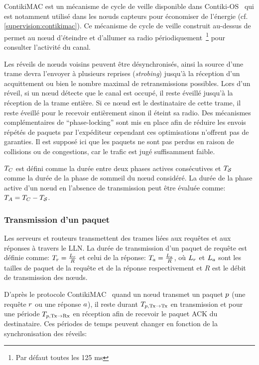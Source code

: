 ContikiMAC est un mécanisme de cycle de veille disponible dans Contiki-OS~\cite{dunkels11contikimac} qui est notamment utilisé dans les nœuds capteurs pour économiser de l'énergie (cf. \ref{supervision:contikimac}).
Ce mécanisme de cycle de veille construit au-dessus de \ieee{} permet au nœud d'éteindre et  d'allumer sa radio périodiquement~\footnote{Par défaut toutes les 125 ms} pour consulter l'activité du canal.

Les réveils de nœuds voisins peuvent être désynchronisés, ainsi la source d'une trame devra l'envoyer à plusieurs reprises ({\em strobing}) jusqu'à la réception d'un acquittement ou bien le nombre maximal de retransmissions possibles.
Lors d'un réveil, si un nœud détecte que le canal est occupé, il reste éveillé jusqu'à la réception de la trame entière.
Si ce nœud est le destinataire de cette trame, il reste éveillé pour le recevoir entièrement sinon il éteint sa radio.
Des mécanismes complémentaires de ``phase-locking'' sont mis en place afin de réduire les envois répétés de paquets par l'expéditeur cependant ces optimisations n'offrent pas de garanties.
Il est supposé ici que les paquets ne sont pas perdus en raison de collisions ou de congestions, car le trafic est jugé suffisamment faible.

$T_C$ est défini comme la durée entre deux phases actives consécutives et $T_{\mathcal{S}}$ comme la durée de la phase de sommeil du nœud considéré.
La durée de la phase active d'un nœud en l'absence de transmission peut être évaluée comme: $T_A = T_C - T_{\mathcal{S}}$.

\subsubsection{Transmission d'un paquet}
\label{contikimac:transmission}

Les serveurs et routeurs transmettent des trames liées aux requêtes et aux réponses à travers le \ac{LLN}.
La durée de transmission d'un paquet de requête est définie comme: $T_r = \frac{L_r}{R}$ et celui de la réponse: $T_a = \frac{L_a}{R}$,  où $L_r$ et $L_a $ sont les tailles de paquet de la requête et de la réponse respectivement et $R$ est le débit de transmission des nœuds.

D'après le protocole ContikiMAC~\cite{dunkels11contikimac} quand un nœud transmet un paquet $p$ (une requête $r$ ou une réponse $a$), il reste durant $T_{p, \textrm{Tx} \to \textrm{Tx}}$ en transmission et pour une période $T_{p, \textrm{Tx} \to \textrm{Rx}}$ en réception afin de recevoir le paquet \ac{ACK} du destinataire.
Ces périodes de temps peuvent changer en fonction de la synchronisation des réveils:

